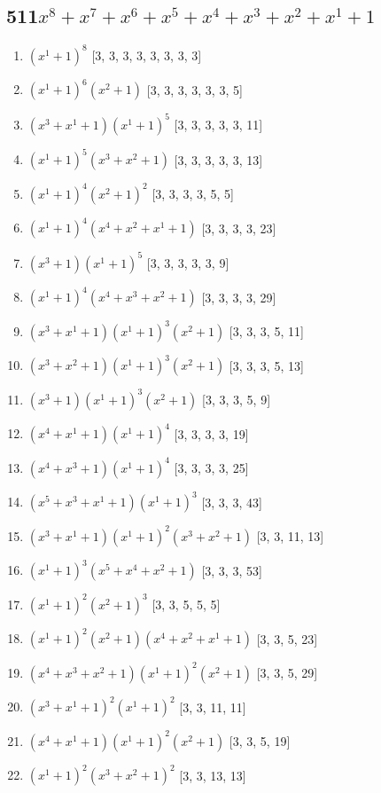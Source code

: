 \documentclass[10pt,twocolumn]{article}
\begin{document}
\subsection*{511$x^{8} + x^{7} + x^{6} + x^{5} + x^{4} + x^{3} + x^{2} + x^{1} + 1$  } 
\begin{enumerate}
\item $(x^{1} + 1)^{8}$  [3, 3, 3, 3, 3, 3, 3, 3]
\item $(x^{1} + 1)^{6}(x^{2} + 1)$  [3, 3, 3, 3, 3, 3, 5]
\item $(x^{3} + x^{1} + 1)(x^{1} + 1)^{5}$  [3, 3, 3, 3, 3, 11]
\item $(x^{1} + 1)^{5}(x^{3} + x^{2} + 1)$  [3, 3, 3, 3, 3, 13]
\item $(x^{1} + 1)^{4}(x^{2} + 1)^{2}$  [3, 3, 3, 3, 5, 5]
\item $(x^{1} + 1)^{4}(x^{4} + x^{2} + x^{1} + 1)$  [3, 3, 3, 3, 23]
\item $(x^{3} + 1)(x^{1} + 1)^{5}$  [3, 3, 3, 3, 3, 9]
\item $(x^{1} + 1)^{4}(x^{4} + x^{3} + x^{2} + 1)$  [3, 3, 3, 3, 29]
\item $(x^{3} + x^{1} + 1)(x^{1} + 1)^{3}(x^{2} + 1)$  [3, 3, 3, 5, 11]
\item $(x^{3} + x^{2} + 1)(x^{1} + 1)^{3}(x^{2} + 1)$  [3, 3, 3, 5, 13]
\item $(x^{3} + 1)(x^{1} + 1)^{3}(x^{2} + 1)$  [3, 3, 3, 5, 9]
\item $(x^{4} + x^{1} + 1)(x^{1} + 1)^{4}$  [3, 3, 3, 3, 19]
\item $(x^{4} + x^{3} + 1)(x^{1} + 1)^{4}$  [3, 3, 3, 3, 25]
\item $(x^{5} + x^{3} + x^{1} + 1)(x^{1} + 1)^{3}$  [3, 3, 3, 43]
\item $(x^{3} + x^{1} + 1)(x^{1} + 1)^{2}(x^{3} + x^{2} + 1)$  [3, 3, 11, 13]
\item $(x^{1} + 1)^{3}(x^{5} + x^{4} + x^{2} + 1)$  [3, 3, 3, 53]
\item $(x^{1} + 1)^{2}(x^{2} + 1)^{3}$  [3, 3, 5, 5, 5]
\item $(x^{1} + 1)^{2}(x^{2} + 1)(x^{4} + x^{2} + x^{1} + 1)$  [3, 3, 5, 23]
\item $(x^{4} + x^{3} + x^{2} + 1)(x^{1} + 1)^{2}(x^{2} + 1)$  [3, 3, 5, 29]
\item $(x^{3} + x^{1} + 1)^{2}(x^{1} + 1)^{2}$  [3, 3, 11, 11]
\item $(x^{4} + x^{1} + 1)(x^{1} + 1)^{2}(x^{2} + 1)$  [3, 3, 5, 19]
\item $(x^{1} + 1)^{2}(x^{3} + x^{2} + 1)^{2}$  [3, 3, 13, 13]

\end{enumerate}
\end{document}
